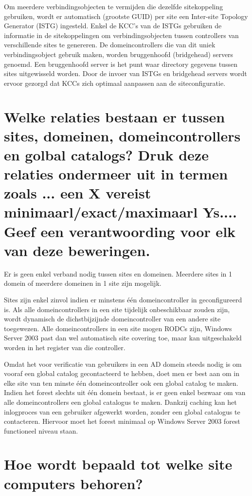 Om meerdere verbindingsobjecten te vermijden die dezelfde sitekoppeling
gebruiken, wordt er automatisch (grootste GUID) per site een Inter-site Topology
Generator (ISTG) ingesteld. Enkel de KCC's van de ISTGs gebruiken de informatie
in de sitekoppelingen om verbindingsobjecten tussen controllers van
verschillende sites te genereren. De domeincontrollers die van dit uniek
verbindingsobject gebruik maken, worden bruggenhoofd (bridgehead) servers
genoemd. Een bruggenhoofd server is het punt waar directory gegevens tussen
sites uitgewisseld worden. Door de invoer van ISTGs en bridgehead servers wordt
ervoor gezorgd dat KCCs zich optimaal aanpassen aan de siteconfiguratie.

\section{Welke relaties bestaan er tussen sites, domeinen, domeincontrollers en
golbal catalogs? Druk deze relaties ondermeer uit in termen zoals ... een X
vereist minimaarl/exact/maximaarl Ys.... Geef een verantwoording voor elk van
deze beweringen.}

Er is geen enkel verband nodig tussen sites en domeinen. Meerdere sites in 1
domein of meerdere domeinen in 1 site zijn mogelijk.

Sites zijn enkel zinvol indien er minstens één domeincontroller in
geconfigureerd is. Als alle domeincontrollers in een site tijdelijk
onbeschikbaar zouden zijn, wordt dynamisch de dichstbijzijnde domeincontroller
van een andere site toegewezen. Alle domeincontrollers in een site mogen RODCs
zijn, Windows Server 2003 past dan wel automatisch site covering toe, maar kan
uitgeschakeld worden in het register van die controller.

Omdat het voor verificatie van gebruikers in een AD domein steeds nodig is om
vooraf een global catalog gecontacteerd te hebben, doet men er best aan om in
elke site van ten minste één domeincontroller ook een global catalog te maken.
Indien het forest slechts uit één domein bestaat, is er geen enkel bezwaar om
van alle domeincontrollers een global catalogus te maken. Dankzij caching kan
het inlogproces van een gebruiker afgewerkt worden, zonder een global catalogus
te contacteren. Hiervoor moet het forest minimaal op Windows Server 2003 forest
functioneel niveau staan.

\section{Hoe wordt bepaald tot welke site computers behoren?}

